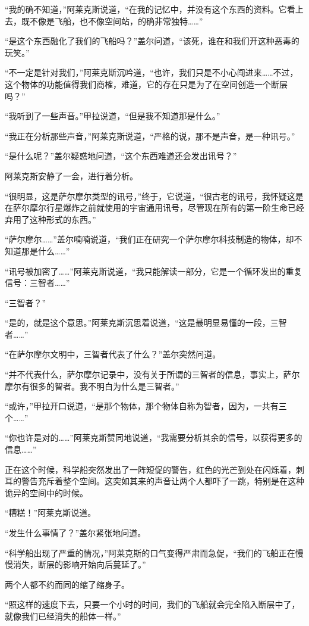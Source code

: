 “我的确不知道，”阿莱克斯说道，“在我的记忆中，并没有这个东西的资料。它看上去，既不像是飞船，也不像空间站，的确非常独特……” 

“是这个东西融化了我们的飞船吗？”盖尔问道，“该死，谁在和我们开这种恶毒的玩笑。” 

“不一定是针对我们，”阿莱克斯沉吟道，“也许，我们只是不小心闯进来……不过，这个物体的功能值得我们商榷，难道，它的存在只是为了在空间创造一个断层吗？” 

“我听到了一些声音。”甲拉说道，“但是我不知道那是什么。” 

“我正在分析那些声音，”阿莱克斯说道，“严格的说，那不是声音，是一种讯号。” 

“是什么呢？”盖尔疑惑地问道，“这个东西难道还会发出讯号？” 

阿莱克斯安静了一会，进行着分析。 

“很明显，这是萨尔摩尔类型的讯号，”终于，它说道，“很古老的讯号，我怀疑这是在萨尔摩尔行星爆炸之前就使用的宇宙通用讯号，尽管现在所有的第一阶生命已经弃用了这种形式的东西。” 

“萨尔摩尔……”盖尔喃喃说道，“我们正在研究一个萨尔摩尔科技制造的物体，却不知道那是什么……” 

“讯号被加密了……”阿莱克斯说道，“我只能解读一部分，它是一个循环发出的重复信号：三智者……” 

“三智者？” 

“是的，就是这个意思。”阿莱克斯沉思着说道，“这是最明显易懂的一段，三智者……” 

“在萨尔摩尔文明中，三智者代表了什么？”盖尔突然问道。 

“并不代表什么，萨尔摩尔记录中，没有关于所谓的三智者的信息，事实上，萨尔摩尔有很多的智者。我不明白为什么是三智者。” 

“或许，”甲拉开口说道，“是那个物体，那个物体自称为智者，因为，一共有三个……” 

“你也许是对的……”阿莱克斯赞同地说道，“我需要分析其余的信号，以获得更多的信息……” 

正在这个时候，科学船突然发出了一阵短促的警告，红色的光芒到处在闪烁着，刺耳的警告充斥着整个空间。这突如其来的声音让两个人都吓了一跳，特别是在这种诡异的空间中的时候。 

“糟糕！”阿莱克斯说道。 

“发生什么事情了？”盖尔紧张地问道。 

“科学船出现了严重的情况，”阿莱克斯的口气变得严肃而急促，“我们的飞船正在慢慢消失，断层的影响开始向后蔓延了。” 

两个人都不约而同的缩了缩身子。 

“照这样的速度下去，只要一个小时的时间，我们的飞船就会完全陷入断层中了，就像我们已经消失的船体一样。” 


